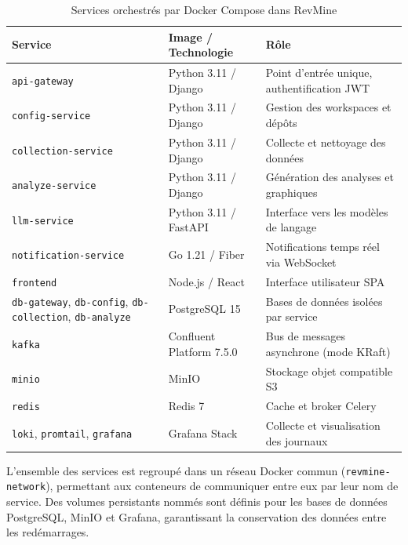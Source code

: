 \begin{table}[H]
\centering
\small
\caption{Services orchestrés par Docker Compose dans RevMine}
\label{tab:docker-services}
\begin{tabular}{|>{\raggedright\arraybackslash}p{4cm}
                |>{\raggedright\arraybackslash}p{4cm}
                |>{\raggedright\arraybackslash}p{5cm}|}
\hline
\textbf{Service} & \textbf{Image / Technologie} & \textbf{Rôle} \\
\hline
\texttt{api-gateway} & Python 3.11 / Django & Point d'entrée unique, authentification JWT \\
\hline
\texttt{config-service} & Python 3.11 / Django & Gestion des workspaces et dépôts \\
\hline
\texttt{collection-service} & Python 3.11 / Django & Collecte et nettoyage des données \\
\hline
\texttt{analyze-service} & Python 3.11 / Django & Génération des analyses et graphiques \\
\hline
\texttt{llm-service} & Python 3.11 / FastAPI & Interface vers les modèles de langage \\
\hline
\texttt{notification-service} & Go 1.21 / Fiber & Notifications temps réel via WebSocket \\
\hline
\texttt{frontend} & Node.js / React & Interface utilisateur SPA \\
\hline
\texttt{db-gateway}, \texttt{db-config}, \texttt{db-collection}, \texttt{db-analyze} & PostgreSQL 15 & Bases de données isolées par service \\
\hline
\texttt{kafka} & Confluent Platform 7.5.0 & Bus de messages asynchrone (mode KRaft) \\
\hline
\texttt{minio} & MinIO & Stockage objet compatible S3 \\
\hline
\texttt{redis} & Redis 7 & Cache et broker Celery \\
\hline
\texttt{loki}, \texttt{promtail}, \texttt{grafana} & Grafana Stack & Collecte et visualisation des journaux \\
\hline
\end{tabular}
\end{table}

L'ensemble des services est regroupé dans un réseau Docker commun (\texttt{revmine-network}),
permettant aux conteneurs de communiquer entre eux par leur nom de service. Des volumes
persistants nommés sont définis pour les bases de données PostgreSQL, MinIO et Grafana,
garantissant la conservation des données entre les redémarrages.

